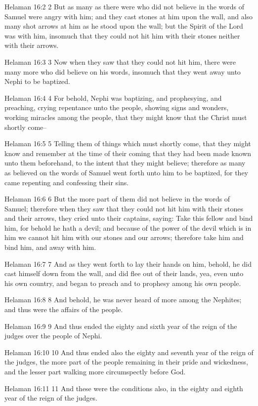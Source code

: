 Helaman 16:2
 2 But as many as there were who did not believe in the words of
Samuel were angry with him; and they cast stones at him upon the
wall, and also many shot arrows at him as he stood upon the wall;
but the Spirit of the Lord was with him, insomuch that they could
not hit him with their stones neither with their arrows.

Helaman 16:3
 3 Now when they saw that they could not hit him, there were many
more who did believe on his words, insomuch that they went away
unto Nephi to be baptized.

Helaman 16:4
 4 For behold, Nephi was baptizing, and prophesying, and
preaching, crying repentance unto the people, showing signs and
wonders, working miracles among the people, that they might know
that the Christ must shortly come--

Helaman 16:5
 5 Telling them of things which must shortly come, that they
might know and remember at the time of their coming that they had
been made known unto them beforehand, to the intent that they
might believe; therefore as many as believed on the words of
Samuel went forth unto him to be baptized, for they came
repenting and confessing their sins.

Helaman 16:6
 6 But the more part of them did not believe in the words of
Samuel; therefore when they saw that they could not hit him with
their stones and their arrows, they cried unto their captains,
saying: Take this fellow and bind him, for behold he hath a
devil; and because of the power of the devil which is in him we
cannot hit him with our stones and our arrows; therefore take him
and bind him, and away with him.

Helaman 16:7
 7 And as they went forth to lay their hands on him, behold, he
did cast himself down from the wall, and did flee out of their
lands, yea, even unto his own country, and began to preach and to
prophesy among his own people.

Helaman 16:8
 8 And behold, he was never heard of more among the Nephites; and
thus were the affairs of the people.

Helaman 16:9
 9 And thus ended the eighty and sixth year of the reign of the
judges over the people of Nephi.

Helaman 16:10
 10 And thus ended also the eighty and seventh year of the reign
of the judges, the more part of the people remaining in their
pride and wickedness, and the lesser part walking more
circumspectly before God.

Helaman 16:11
 11 And these were the conditions also, in the eighty and eighth
year of the reign of the judges.

